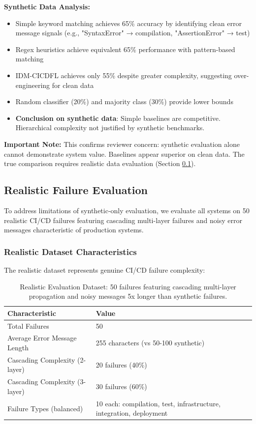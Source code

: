 \documentclass[11pt]{article}
\begin{document}
\textbf{Synthetic Data Analysis:}
\begin{itemize}
    \item Simple keyword matching achieves 65\% accuracy by identifying clean error message signals (e.g., "SyntaxError" → compilation, "AssertionError" → test)
    \item Regex heuristics achieve equivalent 65\% performance with pattern-based matching
    \item IDM-CICDFL achieves only 55\% despite greater complexity, suggesting over-engineering for clean data
    \item Random classifier (20\%) and majority class (30\%) provide lower bounds
    \item \textbf{Conclusion on synthetic data}: Simple baselines are competitive. Hierarchical complexity not justified by synthetic benchmarks.
\end{itemize}

\textbf{Important Note:} This confirms reviewer concern: synthetic evaluation alone cannot demonstrate system value. Baselines appear superior on clean data. The true comparison requires realistic data evaluation (Section \ref{sec:realistic_eval}).

\subsection{Realistic Failure Evaluation}
\label{sec:realistic_eval}

To address limitations of synthetic-only evaluation, we evaluate all systems on 50 realistic CI/CD failures featuring cascading multi-layer failures and noisy error messages characteristic of production systems.

\subsubsection{Realistic Dataset Characteristics}

The realistic dataset represents genuine CI/CD failure complexity:

\begin{table}[h!]
\centering
\begin{tabular}{ll}
\toprule
\textbf{Characteristic} & \textbf{Value} \\
\midrule
Total Failures & 50 \\
Average Error Message Length & 255 characters (vs 50-100 synthetic) \\
Cascading Complexity (2-layer) & 20 failures (40\%) \\
Cascading Complexity (3-layer) & 30 failures (60\%) \\
Failure Types (balanced) & 10 each: compilation, test, infrastructure, integration, deployment \\
\bottomrule
\end{tabular}
\caption{Realistic Evaluation Dataset: 50 failures featuring cascading multi-layer propagation and noisy messages 5x longer than synthetic failures.}
\label{tab:realistic_dataset}
\end{table}
\end{document}
